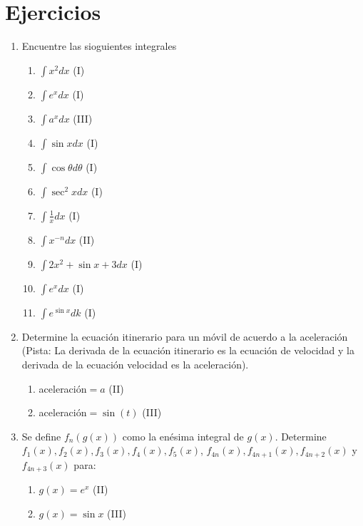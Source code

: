 \documentclass[spanish,12pt]{article}
\begin{document}
\section{Ejercicios}
\begin{enumerate}[1)]
    \item Encuentre las sioguientes integrales
    \begin{enumerate}
        \item $\int x^2dx$ (I)
        \item $\int e^xdx$ (I)
        \item $\int a^xdx$ (III)
        \item $\int \sin{x}dx$ (I)
        \item $\int \cos{\theta}d\theta$ (I)
        \item $\int \sec^2{x}dx$ (I)
        \item $\int \frac{1}{x}dx$ (I)
        \item $\int x^{-n}dx$ (II)
        \item $\int 2x^2 + \sin{x} + 3 dx$ (I)
        \item $\int e^xdx$ (I)
        \item $\int e^{\sin{x}}dk$ (I)
    \end{enumerate}
    \item Determine la ecuación itinerario para un móvil de acuerdo a la aceleración (Pista: La derivada de la ecuación itinerario es la ecuación de velocidad y la derivada de la ecuación velocidad es la aceleración).
    \begin{enumerate}
        \item aceleración$=a$ (II)
        \item aceleración$=\sin(t)$ (III)
    \end{enumerate}
    \item Se define $f_n(g(x))$ como la enésima integral de $g(x)$. Determine $f_1(x), f_2(x), f_3(x), f_4(x), f_5(x)$, $f_{4n}(x), f_{4n+1}(x), f_{4n+2}(x)$ y $f_{4n+3}(x)$ para:
        \begin{enumerate}
            \item $g(x)=e^x$ (II)
            \item $g(x)=\sin{x}$ (III)
        \end{enumerate}
\end{enumerate}
\end{document}
